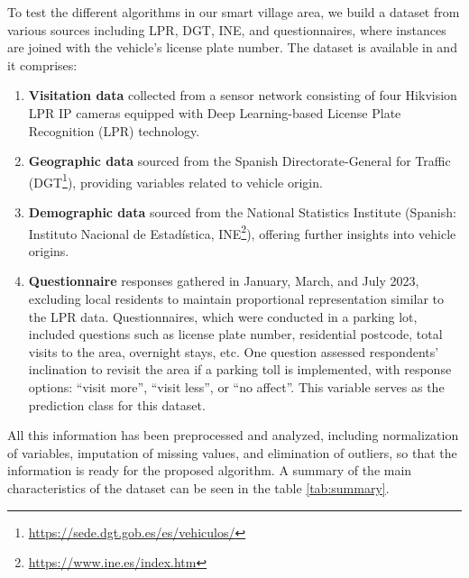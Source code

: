 \documentclass[12pt]{book}
\begin{document}
To test the different algorithms in our smart village area, we build a dataset from various sources including LPR, DGT, INE, and questionnaires, where instances are joined with the vehicle's license plate number. The dataset is available in \citep{duran_lopez_2024} and it comprises:
\begin{enumerate}
    \item \textbf{Visitation data} collected from a sensor network consisting of four Hikvision LPR IP cameras equipped with Deep Learning-based License Plate Recognition (LPR) technology.
    \item \textbf{Geographic data} sourced from the Spanish Directorate-General for Traffic (DGT\footnote{\url{https://sede.dgt.gob.es/es/vehiculos/}}), providing variables related to vehicle origin.
    \item \textbf{Demographic data} sourced from the National Statistics Institute (Spanish: Instituto Nacional de Estadística, INE\footnote{\url{https://www.ine.es/index.htm}}), offering further insights into vehicle origins.
    \item \textbf{Questionnaire} responses gathered in January, March, and July 2023, excluding local residents to maintain proportional representation similar to the LPR data. Questionnaires, which were conducted in a parking lot, included questions such as license plate number, residential postcode, total visits to the area, overnight stays, etc. One question assessed respondents' inclination to revisit the area if a parking toll is implemented, with response options: ``visit more'', ``visit less'', or ``no affect''. This variable serves as the prediction class for this dataset.
\end{enumerate}


All this information has been preprocessed and analyzed, including normalization of variables, imputation of missing values, and elimination of outliers, so that the information is ready for the proposed algorithm. A summary of the main characteristics of the dataset can be seen in the table \ref{tab:summary}.
\end{document}

